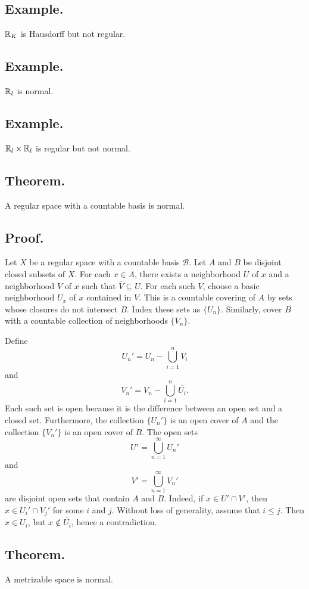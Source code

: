 \documentclass[titlepage]{article}
\begin{document}
\subsection{Example.} $\mathbb{R}_{K}$ is Hausdorff but not regular.

\subsection{Example.} $\mathbb{R}_{l}$ is normal.

\subsection{Example.} $\mathbb{R}_{l} \times \mathbb{R}_{l}$ is regular but not normal.

\subsection{Theorem.} A regular space with a countable basis is normal.

\subsection{Proof.} Let $X$ be a regular space with a countable basis $\mathcal{B}$. Let $A$ and $B$ be disjoint closed subsets of $X$. For each $x \in A$, there exists a neighborhood $U$ of $x$ and a neighborhood $V$ of $x$ such that $\overline{V} \subseteq U$. For each such $V$, choose a basic neighborhood $U_{x}$ of $x$ contained in $V$. This is a countable covering of $A$ by sets whose closures do not intersect $B$. Index these sets as $\{U_{n}\}$. Similarly, cover $B$ with a countable collection of neighborhoods $\{V_{n}\}$.

Define 
$$U_{n}' = U_{n} - \bigcup_{i=1}^{n} \overline{V_{i}}$$
and 
$$V_{n}' = V_{n} - \bigcup_{i=1}^{n} \overline{U_{i}}.$$
Each such set is open because it is the difference between an open set and a closed set. Furthermore, the collection $\{U_{n}'\}$ is an open cover of $A$ and the collection $\{V_{n}'\}$ is an open cover of $B$. The open sets 
$$U' = \bigcup_{n=1}^{\infty} U_{n}'$$
and 
$$V' = \bigcup_{n=1}^{\infty} V_{n}'$$
are disjoint open sets that contain $A$ and $B$. Indeed, if $x \in U' \cap V'$, then $x \in U_{i}' \cap V_{j}'$ for some $i$ and $j$. Without loss of generality, assume that $i \leq j$. Then $x \in U_{i}$, but $x \not\in \overline{U_{i}}$, hence a contradiction.

\subsection{Theorem.} A metrizable space is normal.
\end{document}
